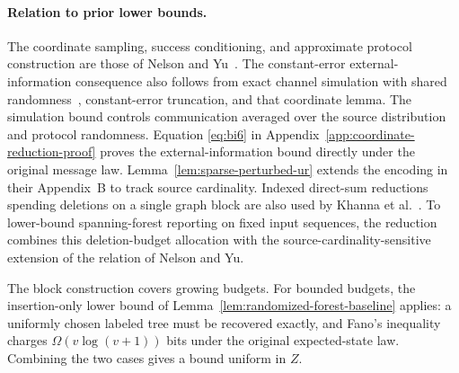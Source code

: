 \documentclass[11pt,letterpaper]{article}
\numberwithin{equation}{section}
\begin{document}
\paragraph{Relation to prior lower bounds.}
The coordinate sampling, success conditioning, and approximate protocol construction are those of Nelson and Yu~\cite[Lemma~3]{NelsonYu2019}.
The constant-error external-information consequence also follows from exact channel simulation with shared randomness~\cite[Result~1]{HJMR2010}, constant-error truncation, and that coordinate lemma.
The simulation bound controls communication averaged over the source distribution and protocol randomness.
Equation \eqref{eq:bi6} in Appendix~\ref{app:coordinate-reduction-proof} proves the external-information bound directly under the original message law.
Lemma~\ref{lem:sparse-perturbed-ur} extends the encoding in their Appendix~B to track source cardinality.
Indexed direct-sum reductions spending deletions on a single graph block are also used by Khanna et al.~\cite[Sections~1.2 and~4]{KKD2025}.
To lower-bound spanning-forest reporting on fixed input sequences, the reduction combines this deletion-budget allocation with the source-cardinality-sensitive extension of the relation of Nelson and Yu.

The block construction covers growing budgets.
For bounded budgets, the insertion-only lower bound of Lemma~\ref{lem:randomized-forest-baseline} applies: a uniformly chosen labeled tree must be recovered exactly, and Fano's inequality charges $\Omega(v\log(v+1))$ bits under the original expected-state law.
Combining the two cases gives a bound uniform in $Z$.
\end{document}
